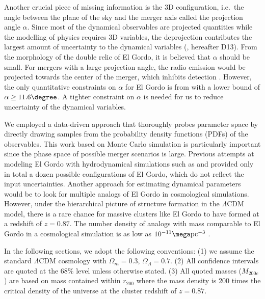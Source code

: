 Another crucial piece of missing information is the 3D
configuration, i.e.\ the angle between the plane of the sky and the merger
axis called the projection angle $\alpha$. Since most of the dynamical
observables are projected quantities while the modelling of physics
requires 3D
variables, the deprojection contributes the
largest amount of uncertainty to the dynamical variables
(\citealt{D13}, hereafter D13).
From the morphology of the double relic of El Gordo, it is believed that
$\alpha$ should be small. For mergers with a
large projection angle, the radio emission would be projected towards the
center of the merger, which inhibits detection \citep{Vazza11}.
However, the only quantitative constraints on $\alpha$ for El Gordo is from
\cite{L13} with a lower bound of $\alpha \geq 11.6 \degree$. A tighter
constraint on $\alpha$ is needed for us to reduce uncertainty of the
dynamical variables. 
\par 
We employed a data-driven approach that thoroughly probes parameter
space by directly drawing samples from the probability density functions
(PDFs) of
the observables. 
This work based on Monte Carlo simulation is particularly important since
the phase space of possible merger scenarios is large. Previous attempts at modeling El Gordo with hydrodynamical
simulations such as \cite{Donnert13} and \cite{Molnar14} provided only in
total a dozen possible configurations of El Gordo, which do not
reflect the input uncertainties. Another approach for
estimating dynamical parameters would be to look for multiple analogs of El Gordo in cosmological
simulations.  However, under the hierarchical picture
of structure formation in the $\Lambda$CDM model, there is a rare chance
for massive clusters like El Gordo to have formed at a redshift of $z = 0.87$.  
The number density of analogs with mass comparable to El Gordo in a
cosmological simulation is as low as $10^{-11} \mega\text{pc}^{-3}$ .  
\par
In the following sections, we adopt the following conventions: (1) we
assume the standard $\Lambda$CDM cosmology with $\Omega_{m} = 0.3$, $\Omega_{\Lambda} = 0.7$. (2) All confidence intervals are quoted at the 68\% level unless otherwise stated. 
(3) All quoted masses ($M_{200c}$) are based on mass contained
within $r_{200}$ where the mass density is 200 times the critical density
of the universe at the cluster redshift of $z = 0.87$. 
